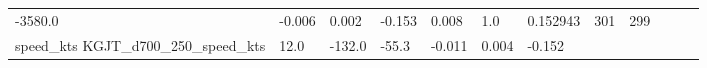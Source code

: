 \documentclass[11pt]{article}
\begin{document}
\begin{longtable}[]{@{}llllllllllll@{}}
\begin{minipage}[t]{0.04\columnwidth}
-3580.0\strut
\end{minipage} & \begin{minipage}[t]{0.04\columnwidth}\raggedright\strut
-0.006\strut
\end{minipage} & \begin{minipage}[t]{0.05\columnwidth}\raggedright\strut
0.002\strut
\end{minipage} & \begin{minipage}[t]{0.04\columnwidth}\raggedright\strut
-0.153\strut
\end{minipage} & \begin{minipage}[t]{0.04\columnwidth}\raggedright\strut
0.008\strut
\end{minipage} & \begin{minipage}[t]{0.05\columnwidth}\raggedright\strut
1.0\strut
\end{minipage} & \begin{minipage}[t]{0.05\columnwidth}\raggedright\strut
0.152943\strut
\end{minipage} & \begin{minipage}[t]{0.05\columnwidth}\raggedright\strut
301\strut
\end{minipage} & \begin{minipage}[t]{0.07\columnwidth}\raggedright\strut
299\strut
\end{minipage}\tabularnewline
\begin{minipage}[t]{0.18\columnwidth}\raggedright\strut
speed\_kts KGJT\_d700\_250\_speed\_kts\strut
\end{minipage} & \begin{minipage}[t]{0.04\columnwidth}\raggedright\strut
12.0\strut
\end{minipage} & \begin{minipage}[t]{0.04\columnwidth}\raggedright\strut
-132.0\strut
\end{minipage} & \begin{minipage}[t]{0.04\columnwidth}\raggedright\strut
-55.3\strut
\end{minipage} & \begin{minipage}[t]{0.04\columnwidth}\raggedright\strut
-0.011\strut
\end{minipage} & \begin{minipage}[t]{0.05\columnwidth}\raggedright\strut
0.004\strut
\end{minipage} & \begin{minipage}[t]{0.04\columnwidth}\raggedright\strut
-0.152\strut
\end{minipage} & \begin{minipage}[t]{0.04\columnwidth}\raggedright\strut

\end{minipage}
\end{longtable}
\end{document}
